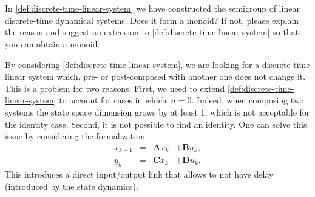 \

\

\begin{exercise}
    In \cref{def:discrete-time-linear-system} we have constructed the semigroup of linear discrete-time dynamical systems.
    Does it form a monoid?
    If not, please explain the reason and suggest an extension to \cref{def:discrete-time-linear-system} so that you can obtain a monoid.
\end{exercise}
\begin{solution}
    By considering \cref{def:discrete-time-linear-system}, we are looking for a discrete-time linear system which, pre- or post-composed with another one does not change it.
    This is a problem for two reasons.
    First, we need to extend \cref{def:discrete-time-linear-system} to account for cases in which~$n=0$.
    Indeed, when composing two systems the state space dimension grows by at least 1, which is not acceptable for the identity case.
    Second, it is not possible to find an identity.
    One can solve this issue by considering the formalization
    \begin{equation}
        \label{eq:discrete-time-dynamics-D}
        \begin{aligned}
            x_{k+1} & = & \mathbf{A} x_k & + \mathbf{B} u_k, \\
            y_{k}   & = & \mathbf{C} x_k & + \mathbf{D} u_k.
        \end{aligned}
    \end{equation}
    This introduces a direct input/output link that allows to not have delay (introduced by the state dynamics).
\end{solution}

